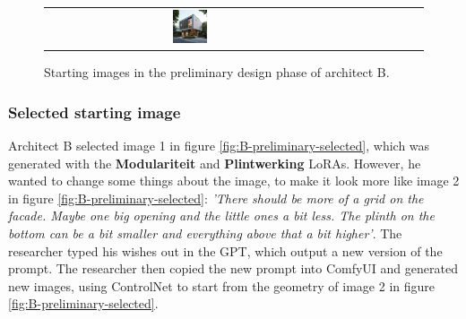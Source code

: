 \begin{figure}[H]
{\begin{tabular}{c c c c c c c c}
    \href{https://github.com/matijspeeters/Thesis/blob/main/Images/Results/Architect-B_Fixed-images/2-preliminary_design/Zonder_lora_00040_.png}{\includegraphics[width=0.12\textwidth]{Images/Results/Architect-B_Fixed-images/2-preliminary_design/Zonder_lora_00040_.png}} \\
  \end{tabular}
  }
  \caption{Starting images in the preliminary design phase of architect B.}
  \label{fig:horizontal-lora-comparison}
\end{figure}
\subsubsection{Selected starting image}
Architect B selected image 1 in figure \ref{fig:B-preliminary-selected}, which was generated with the \textbf{Modulariteit} and \textbf{Plintwerking} LoRAs. However, he wanted to change some things about the image, to make it look more like image 2 in figure \ref{fig:B-preliminary-selected}: \textit{'There should be more of a grid on the facade. Maybe one big opening and the little ones a bit less. The plinth on the bottom can be a bit smaller and everything above that a bit higher'}. The researcher typed his wishes out in the GPT, which output a new version of the prompt. The researcher then copied the new prompt into ComfyUI and generated new images, using ControlNet to start from the geometry of image 2 in figure \ref{fig:B-preliminary-selected}.
